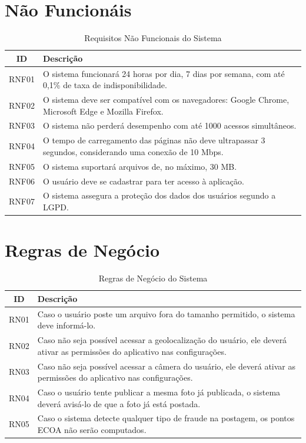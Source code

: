 \documentclass[
  12pt,
  a4paper,
  oneside,
  chapter=TITLE,
  section=TITLE,
  brazil
]{abntex2}
\begin{document}
\section{Não Funcionáis}
\begin{table}[h!]
\centering
\begin{tabular}{|c|p{10cm}|}
\hline
\textbf{ID} & \textbf{Descrição} \\
\hline
RNF01 & O sistema funcionará 24 horas por dia, 7 dias por semana, com até 0,1\% de taxa de indisponibilidade. \\
\hline
RNF02 & O sistema deve ser compatível com os navegadores: Google Chrome, Microsoft Edge e Mozilla Firefox. \\
\hline
RNF03 & O sistema não perderá desempenho com até 1000 acessos simultâneos. \\
\hline
RNF04 & O tempo de carregamento das páginas não deve ultrapassar 3 segundos, considerando uma conexão de 10 Mbps. \\
\hline
RNF05 & O sistema suportará arquivos de, no máximo, 30 MB. \\
\hline
RNF06 & O usuário deve se cadastrar para ter acesso à aplicação. \\
\hline
RNF07 & O sistema assegura a proteção dos dados dos usuários segundo a LGPD. \\
\hline
\end{tabular}
\caption{Requisitos Não Funcionais do Sistema}
\label{tab:requisitos_nao_funcionais}
\end{table}

\section{Regras de Negócio}
\begin{table}[h!]
\centering
\begin{tabular}{|c|p{10cm}|}
\hline
\textbf{ID} & \textbf{Descrição} \\
\hline
RN01 & Caso o usuário poste um arquivo fora do tamanho permitido, o sistema deve informá-lo. \\
\hline
RN02 & Caso não seja possível acessar a geolocalização do usuário, ele deverá ativar as permissões do aplicativo nas configurações. \\
\hline
RN03 & Caso não seja possível acessar a câmera do usuário, ele deverá ativar as permissões do aplicativo nas configurações. \\
\hline
RN04 & Caso o usuário tente publicar a mesma foto já publicada, o sistema deverá avisá-lo de que a foto já está postada. \\
\hline
RN05 & Caso o sistema detecte qualquer tipo de fraude na postagem, os pontos ECOA não serão computados. \\
\hline
\end{tabular}
\caption{Regras de Negócio do Sistema}
\label{tab:regras_negocio}
\end{table}
    
\postextual


\end{document}
